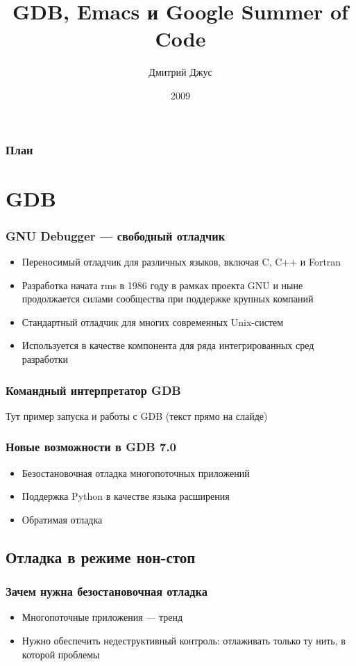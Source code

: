 \documentclass[onlymath]{beamer}
\title{GDB, Emacs и Google Summer of Code }
\author{Дмитрий Джус}
\institute{МГТУ им. Н.Э.Баумана}
\date{2009}
\begin{document}
\begin{frame}
  \titlepage
\end{frame}

\begin{frame}
  \frametitle{План}
  \tableofcontents
\end{frame}

\section{GDB}
\begin{frame}
  \frametitle{GNU Debugger — свободный отладчик}

  \begin{itemize}
  \item Переносимый отладчик для различных языков, включая C, C++ и Fortran
  \item Разработка начата rms в 1986 году в рамках проекта GNU и ныне
    продолжается силами сообщества при поддержке крупных компаний
  \item Стандартный отладчик для многих современных Unix-систем
  \item Используется в качестве компонента для ряда интегрированных
    сред разработки
  \end{itemize}
\end{frame}

\begin{frame}
  \frametitle{Командный интерпретатор GDB}
  Тут пример запуска и работы с GDB (текст прямо на слайде)
\end{frame}

\begin{frame}
  \frametitle{Новые возможности в GDB 7.0}
  \begin{itemize}
  \item Безостановочная отладка многопоточных приложений

  \item Поддержка Python в качестве языка расширения

  \item Обратимая отладка
  \end{itemize}
\end{frame}

\subsection{Отладка в режиме нон-стоп}
\begin{frame}
  \frametitle{Зачем нужна безостановочная отладка}
  \begin{itemize}
  \item Многопоточные приложения — тренд
  \item Нужно обеспечить недеструктивный контроль: отлаживать только
    ту нить, в которой проблемы
  \end{itemize}
\end{frame}
\end{document}
